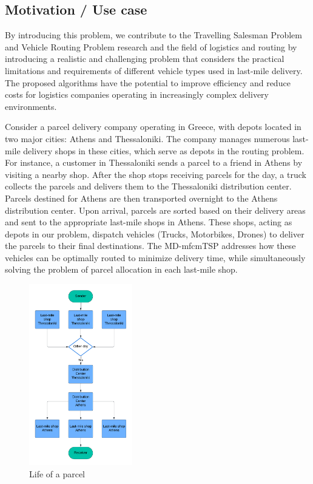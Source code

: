 \documentclass{article}
\begin{document}
	\onecolumn
	\clearpage
	\subsection{Motivation / Use case}
	By introducing this problem, we contribute to the Travelling Salesman Problem and Vehicle Routing Problem research and the field of logistics and routing by introducing a realistic and challenging problem that considers the practical limitations and requirements of different vehicle types used in last-mile delivery. The proposed algorithms have the potential to improve efficiency and reduce costs for logistics companies operating in increasingly complex delivery environments.
	\par 
	Consider a parcel delivery company operating in Greece, with depots located in two major cities: Athens and Thessaloniki. The company manages numerous last-mile delivery shops in these cities, which serve as depots in the routing problem. For instance, a customer in Thessaloniki sends a parcel to a friend in Athens by visiting a nearby shop. After the shop stops receiving parcels for the day, a truck collects the parcels and delivers them to the Thessaloniki distribution center. Parcels destined for Athens are then transported overnight to the Athens distribution center.
	Upon arrival, parcels are sorted based on their delivery areas and sent to the appropriate last-mile shops in Athens. These shops, acting as depots in our problem, dispatch vehicles (Trucks, Motorbikes, Drones) to deliver the parcels to their final destinations. The MD-mfcmTSP addresses how these vehicles can be optimally routed to minimize delivery time, while simultaneously solving the problem of parcel allocation in each last-mile shop.
	\par
	\begin{figure}[h!]
		\caption{Life of a parcel}
		\centering
		\includegraphics[width=0.40\textwidth, height=0.50\textheight]{Parcel-Life}
	\end{figure}
	\clearpage
	\twocolumn
\end{document}
